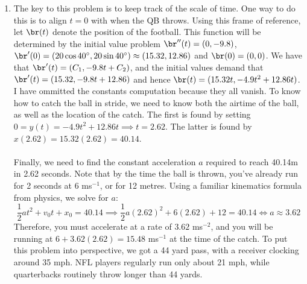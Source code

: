 \begin{enumerate}[resume]
{    }
    {%
    }
    \pagebreak 
    \item {}
    {The key to this problem is to keep track of the scale of time. One way to do this is to align $t=0$ with when the QB throws. Using this frame of reference, let $\br(t)$ denote the position of the football. This function will be determined by the initial value problem $\br''(t) = (0,-9.8)$, $\br'(0) = (20\cos 40^\circ, 20\sin 40^\circ) \approx (15.32,12.86)$ and $\br(0)=(0,0)$. We have that $\br'(t) = (C_1,-9.8t+C_2)$, and the initial values demand that $\br'(t) = (15.32,-9.8t+12.86)$ and hence $\br(t) = (15.32t,-4.9t^2+12.86t)$. I have ommitted the constants computation because they all vanish. To know how to catch the ball in stride, we need to know both the airtime of the ball, as well as the location of the catch. The first is found by setting $0 = y(t) = -4.9t^2+12.86t \implies t = 2.62$. The latter is found by $x(2.62) = 15.32(2.62) = 40.14$.\\\\
Finally, we need to find the constant acceleration $a$ required to reach 40.14m in 2.62 seconds. Note that by the time the ball is thrown, you've already run for 2 seconds at 6 ms$^{-1}$, or for 12 metres. Using a familiar kinematics formula from physics, we solve for $a$: 
\begin{equation*}
    \frac{1}{2}at^2+v_0t + x_0= 40.14 \implies  \frac{1}{2}a(2.62)^2+6(2.62) + 12 = 40.14 \iff a \approx 3.62
\end{equation*}
Therefore, you must accelerate at a rate of $3.62$ ms$^{-2}$, and you will be running at $6+3.62(2.62)=15.48$ ms$^{-1}$ at the time of the catch. To put this problem into perspective, we got a 44 yard pass, with a receiver clocking around 35 mph. NFL players regularly run only about 21 mph, while quarterbacks routinely throw longer than 44 yards. 
    }

	
\end{enumerate}
